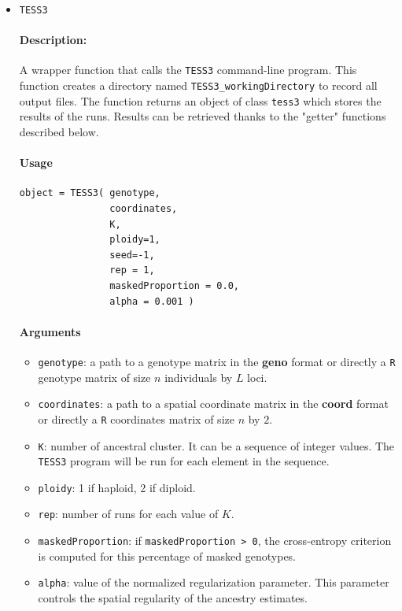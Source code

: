 \documentclass[10pt,a4paper]{article}
\begin{document}
\begin{itemize}

\item \verb|TESS3|

\paragraph{Description:}
A wrapper function that calls the {\tt TESS3} command-line program. This function creates a directory named \verb|TESS3_workingDirectory| to record all output files. The function returns an object of class \verb|tess3| which stores the results of the runs. Results can be retrieved thanks to the "getter" functions described below.
\paragraph{Usage}
\begin{Verbatim}
object = TESS3( genotype,
                coordinates,
                K,
                ploidy=1,
                seed=-1, 
                rep = 1, 
                maskedProportion = 0.0, 
                alpha = 0.001 )
\end{Verbatim}
\paragraph{Arguments}
\begin{itemize}
\item \verb|genotype|: a path to a genotype matrix in the {\bf geno} format or directly a {\tt R} genotype matrix of size $n$ individuals by $L$ loci. 
\item \verb|coordinates|: a path to a spatial coordinate matrix in the {\bf coord} format or directly a {\tt R} coordinates matrix of size $n$ by $2$. 
\item \verb|K|: number of ancestral cluster. It can be a sequence of integer values. The {\tt TESS3} program will be run for each element in the sequence.
\item \verb|ploidy|: 1 if haploid, 2 if diploid.
\item \verb|rep|: number of runs for each value of $K$.
\item \verb|maskedProportion|: if \verb|maskedProportion > 0|, the cross-entropy criterion is computed for this percentage of masked genotypes.
\item \verb|alpha|: value of the normalized regularization parameter. This parameter controls the spatial regularity of the ancestry estimates.
\end{itemize}


\end{itemize}
\end{document}
